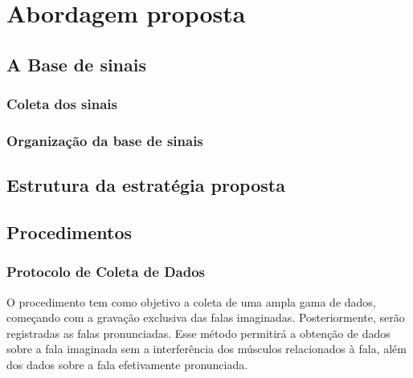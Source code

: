 \chapter{Abordagem proposta} \label{chap:propApproach}
	\section{A Base de sinais}
	    \subsection{Coleta dos sinais}
	    \subsection{Organização da base de sinais}


	\section{Estrutura da estratégia proposta}
	
	\section{Procedimentos}
		\subsection{Protocolo de Coleta de Dados}
			\par O procedimento tem como objetivo a coleta de uma ampla gama de dados, começando com a gravação exclusiva das falas imaginadas. Posteriormente, serão registradas as falas pronunciadas. Esse método permitirá a obtenção de dados sobre a fala imaginada sem a interferência dos músculos relacionados à fala, além dos dados sobre a fala efetivamente pronunciada.
			
